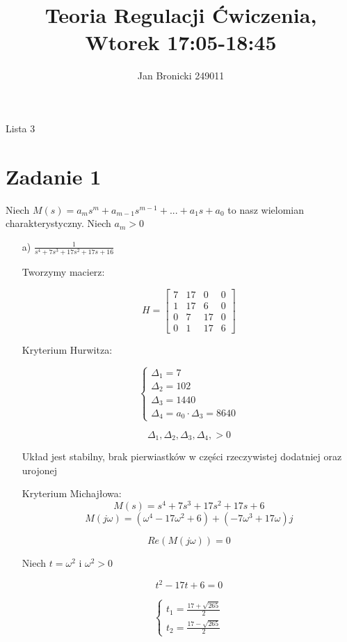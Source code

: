 \documentclass{article}
\title{Teoria Regulacji Ćwiczenia, Wtorek 17:05-18:45}
\author{Jan Bronicki 249011 }
\date{}
\begin{document}
\maketitle


\begin{center}
    Lista 3
\end{center}

\section*{Zadanie 1}

Niech $ M(s) = a_{m}s^{m}+a_{m-1}s^{m-1} + ... + a_{1}s+a_{0}$ to nasz wielomian charakterystyczny.
Niech $a_{m}>0$

\begin{itemize}

    \item[a)] $\frac{1}{s^{4}+7s^{3}+17s^{2}+17s+16}$
    
    Tworzymy macierz:

    $$ H=
    \begin{bmatrix}
        7 & 17 & 0 & 0\\
        1 & 17 & 6 & 0\\
        0 & 7 & 17 & 0\\
        0 & 1 & 17 & 6
        \end{bmatrix}$$

    Kryterium Hurwitza:

    \[\begin{cases}
        \Delta_{1}=7\\
        \Delta_{2}=102\\
        \Delta_{3}=1440\\
        \Delta_{4}=a_{0}\cdot \Delta_{3}=8640
    \end{cases}\]

    $$ \Delta_{1}, \Delta_{2}, \Delta_{3}, \Delta_{4}, > 0 $$
    
    Układ jest stabilny, brak pierwiastków w części rzeczywistej dodatniej oraz urojonej

    Kryterium Michajłowa:
    $$M(s)=s^{4}+7s^{3}+17s^{2}+17s+6$$
    $$ M(j\omega)=(\omega^{4}-17\omega^{2}+6)+(-7\omega^{3}+17\omega)j $$

    $$ Re(M(j\omega))=0 $$

    Niech $t=\omega^{2} $ i $ \omega^{2}>0$

    $$t^{2}-17t+6=0$$

    \[\begin{cases}
        t_{1}=\frac{17+\sqrt{265}}{2}
        \\
        t_{2}=\frac{17-\sqrt{265}}{2}
    \end{cases}\]


\end{itemize}
\end{document}
